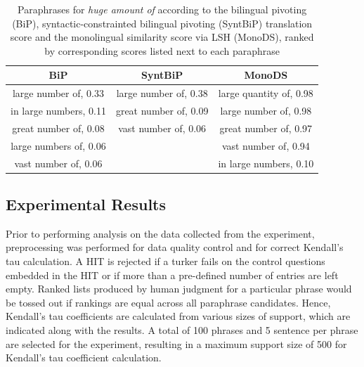 \documentclass[11pt]{article}
\begin{document}
\begin{table}[t!]
\begin{center}
\begin{tabular}{ccc}%
\hline\hline 
\bf \small BiP & \bf \small SyntBiP & \bf \small MonoDS \\ \hline
{\scriptsize large number of, 0.33} & {\scriptsize large number of, 0.38} & {\scriptsize large quantity of, 0.98} \\
{\scriptsize in large numbers, 0.11} & {\scriptsize great number of, 0.09} & {\scriptsize large number of, 0.98} \\
{\scriptsize great number of, 0.08}& {\scriptsize vast number of, 0.06}& {\scriptsize great number of, 0.97}\\
{\scriptsize large numbers of, 0.06} & & {\scriptsize vast number of, 0.94} \\
{\scriptsize vast number of, 0.06}& & {\scriptsize in large numbers, 0.10}\\
\hline
\end{tabular}
\end{center}
\caption{Paraphrases for {\em huge amount of} according to the bilingual pivoting (BiP), syntactic-constrainted bilingual pivoting (SyntBiP) translation score and the monolingual similarity score via LSH (MonoDS), ranked by corresponding scores listed next to each paraphrase}
\label{table2}
\end{table}



\subsection{Experimental Results}
\label{sect:results_fr_en}

Prior to performing analysis on the data collected from the experiment, preprocessing was performed for data quality control and for correct Kendall's tau calculation. A HIT is rejected if a turker fails on the control questions embedded in the HIT or if more than a pre-defined number of entries are left empty. Ranked lists produced by human judgment for a particular phrase would be tossed out if rankings are equal across all paraphrase candidates. Hence, Kendall's tau coefficients are calculated from various sizes of support, which are indicated along with the results. A total of 100 phrases and 5 sentence per phrase are selected for the experiment, resulting in a maximum support size of 500 for Kendall's tau coefficient calculation.
\end{document}
